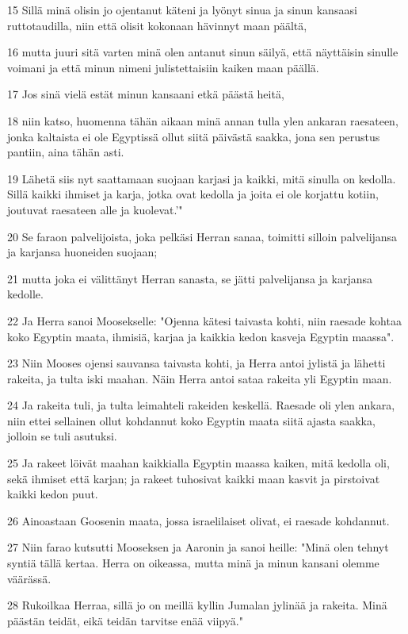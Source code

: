 \par 15 Sillä minä olisin jo ojentanut käteni ja lyönyt sinua ja sinun kansaasi ruttotaudilla, niin että olisit kokonaan hävinnyt maan päältä,
\par 16 mutta juuri sitä varten minä olen antanut sinun säilyä, että näyttäisin sinulle voimani ja että minun nimeni julistettaisiin kaiken maan päällä.
\par 17 Jos sinä vielä estät minun kansaani etkä päästä heitä,
\par 18 niin katso, huomenna tähän aikaan minä annan tulla ylen ankaran raesateen, jonka kaltaista ei ole Egyptissä ollut siitä päivästä saakka, jona sen perustus pantiin, aina tähän asti.
\par 19 Lähetä siis nyt saattamaan suojaan karjasi ja kaikki, mitä sinulla on kedolla. Sillä kaikki ihmiset ja karja, jotka ovat kedolla ja joita ei ole korjattu kotiin, joutuvat raesateen alle ja kuolevat.'"
\par 20 Se faraon palvelijoista, joka pelkäsi Herran sanaa, toimitti silloin palvelijansa ja karjansa huoneiden suojaan;
\par 21 mutta joka ei välittänyt Herran sanasta, se jätti palvelijansa ja karjansa kedolle.
\par 22 Ja Herra sanoi Moosekselle: "Ojenna kätesi taivasta kohti, niin raesade kohtaa koko Egyptin maata, ihmisiä, karjaa ja kaikkia kedon kasveja Egyptin maassa".
\par 23 Niin Mooses ojensi sauvansa taivasta kohti, ja Herra antoi jylistä ja lähetti rakeita, ja tulta iski maahan. Näin Herra antoi sataa rakeita yli Egyptin maan.
\par 24 Ja rakeita tuli, ja tulta leimahteli rakeiden keskellä. Raesade oli ylen ankara, niin ettei sellainen ollut kohdannut koko Egyptin maata siitä ajasta saakka, jolloin se tuli asutuksi.
\par 25 Ja rakeet löivät maahan kaikkialla Egyptin maassa kaiken, mitä kedolla oli, sekä ihmiset että karjan; ja rakeet tuhosivat kaikki maan kasvit ja pirstoivat kaikki kedon puut.
\par 26 Ainoastaan Goosenin maata, jossa israelilaiset olivat, ei raesade kohdannut.
\par 27 Niin farao kutsutti Mooseksen ja Aaronin ja sanoi heille: "Minä olen tehnyt syntiä tällä kertaa. Herra on oikeassa, mutta minä ja minun kansani olemme väärässä.
\par 28 Rukoilkaa Herraa, sillä jo on meillä kyllin Jumalan jylinää ja rakeita. Minä päästän teidät, eikä teidän tarvitse enää viipyä."
